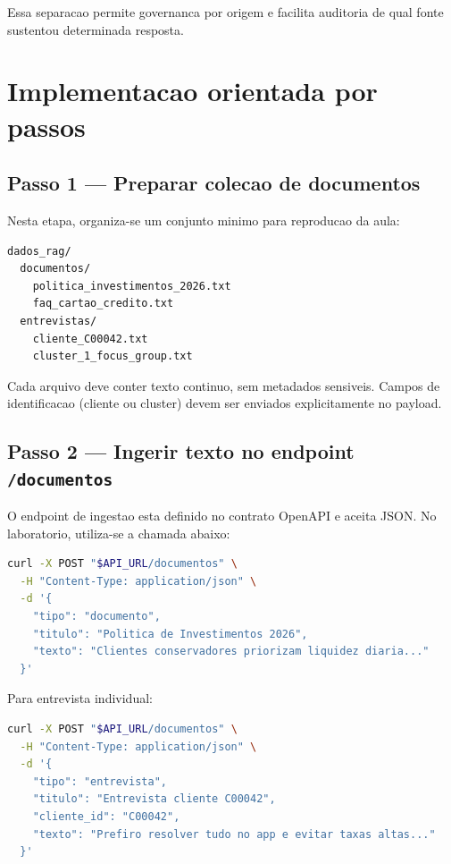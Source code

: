 Essa separacao permite governanca por origem e facilita auditoria de qual
fonte sustentou determinada resposta.

\section{Implementacao orientada por passos}

\subsection{Passo 1 --- Preparar colecao de documentos}

Nesta etapa, organiza-se um conjunto minimo para reproducao da aula:

\begin{lstlisting}[language=bash,
  caption={Colecao minima para laboratorio de RAG corporativo.},
  label={lst:rag_dataset_minimo}]
dados_rag/
  documentos/
    politica_investimentos_2026.txt
    faq_cartao_credito.txt
  entrevistas/
    cliente_C00042.txt
    cluster_1_focus_group.txt
\end{lstlisting}

Cada arquivo deve conter texto continuo, sem metadados sensiveis. Campos de
identificacao (cliente ou cluster) devem ser enviados explicitamente no payload.

\subsection{Passo 2 --- Ingerir texto no endpoint \texttt{/documentos}}

O endpoint de ingestao esta definido no contrato OpenAPI e aceita JSON.
No laboratorio, utiliza-se a chamada abaixo:

\begin{lstlisting}[language=bash,
  caption={Exemplo de ingestao de documento de politica no RAG.},
  label={lst:ingestao_documento_api}]
curl -X POST "$API_URL/documentos" \
  -H "Content-Type: application/json" \
  -d '{
    "tipo": "documento",
    "titulo": "Politica de Investimentos 2026",
    "texto": "Clientes conservadores priorizam liquidez diaria..."
  }'
\end{lstlisting}

Para entrevista individual:

\begin{lstlisting}[language=bash,
  caption={Ingestao de entrevista associada a cliente.},
  label={lst:ingestao_entrevista_cliente}]
curl -X POST "$API_URL/documentos" \
  -H "Content-Type: application/json" \
  -d '{
    "tipo": "entrevista",
    "titulo": "Entrevista cliente C00042",
    "cliente_id": "C00042",
    "texto": "Prefiro resolver tudo no app e evitar taxas altas..."
  }'
\end{lstlisting}

